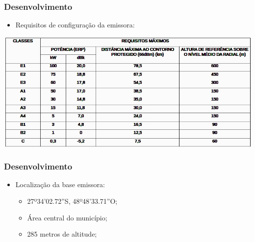 \documentclass{beamer}
\begin{document}
      \begin{frame}
    
      \frametitle{Desenvolvimento}
      
      \begin{itemize}
	 \item Requisitos de configuração da emissora:
	 
	 \end{itemize}
	 
      \begin{center}
      
           \includegraphics[width=.8\linewidth]{figs/requisitos_maximos_novo.jpg}		  		
        \end{center}
      
        
  
	\end{frame}
  
    
    \begin{frame}
    
      \frametitle{Desenvolvimento}
      
      \begin{itemize}
      
          \item Localização da base emissora:
          
	\begin{itemize}
	

	  \item 27º34'02.72''S, 48º48'33.71''O;
	  \item Área central do município;
	  \item 285 metros de altitude;
      
      \end{itemize}
   \end{itemize}
    \end{frame}
    
      
       
\end{document}
